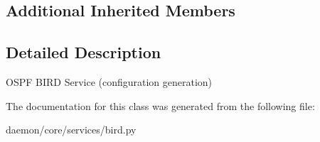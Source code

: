 \subsection*{Additional Inherited Members}


\subsection{Detailed Description}
\begin{DoxyVerb}OSPF BIRD Service (configuration generation)\end{DoxyVerb}
 

The documentation for this class was generated from the following file\+:\begin{DoxyCompactItemize}
\item 
daemon/core/services/bird.\+py\end{DoxyCompactItemize}
